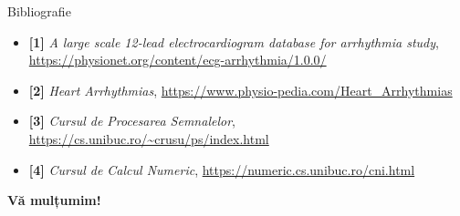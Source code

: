 \documentclass[aspectratio=169,xcolor=dvipsnames]{beamer}
\begin{document}
\begin{frame}{Bibliografie}
  \footnotesize
  \begin{itemize}
    \item \textbf{[1]} \emph{A large scale 12-lead electrocardiogram database for arrhythmia study}, \url{https://physionet.org/content/ecg-arrhythmia/1.0.0/}
    \item \textbf{[2]} \emph{Heart Arrhythmias}, \url{https://www.physio-pedia.com/Heart_Arrhythmias}
    \item \textbf{[3]} \emph{Cursul de Procesarea Semnalelor}, \url{https://cs.unibuc.ro/~crusu/ps/index.html}
    \item \textbf{[4]} \emph{Cursul de Calcul Numeric}, \url{https://numeric.cs.unibuc.ro/cni.html}
  \end{itemize}
\end{frame}

\begin{frame}
  \Huge{\centering \textbf{Vă mulțumim!}}
\end{frame}
\end{document}
